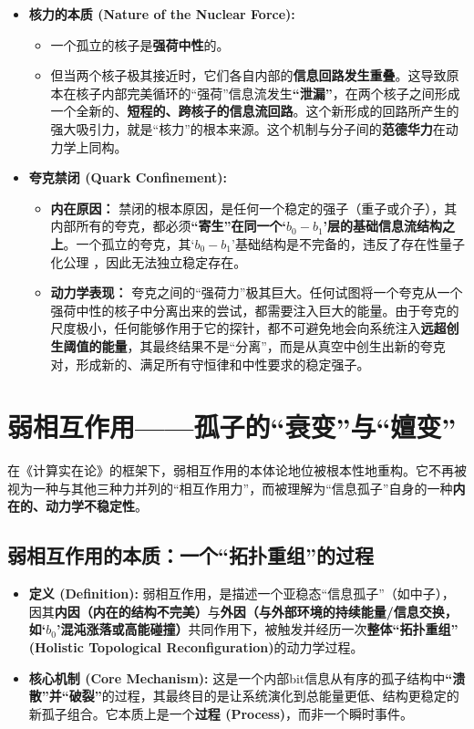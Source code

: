 \documentclass[12pt]{article}
\begin{document}
\begin{itemize}
    \item \textbf{核力的本质 (Nature of the Nuclear Force):}
    \begin{itemize}
        \item 一个孤立的核子是\textbf{强荷中性}的。
        \item 但当两个核子极其接近时，它们各自内部的\textbf{信息回路发生重叠}。这导致原本在核子内部完美循环的``强荷''信息流发生\textbf{``泄漏''}，在两个核子之间形成一个全新的、\textbf{短程的、跨核子的信息流回路}。这个新形成的回路所产生的强大吸引力，就是``核力''的根本来源。这个机制与分子间的\textbf{范德华力}在动力学上同构。
    \end{itemize}
    
    \item \textbf{夸克禁闭 (Quark Confinement):}
    \begin{itemize}
        \item \textbf{内在原因：} 禁闭的根本原因，是任何一个稳定的强子（重子或介子），其内部所有的夸克，都必须\textbf{``寄生''在同一个`$b_0-b_1$'层的基础信息流结构之上}。一个孤立的夸克，其`$b_0-b_1$'基础结构是不完备的，违反了存在性量子化公理 ，因此无法独立稳定存在。
        \item \textbf{动力学表现：} 夸克之间的``强荷力''极其巨大。任何试图将一个夸克从一个强荷中性的核子中分离出来的尝试，都需要注入巨大的能量。由于夸克的尺度极小，任何能够作用于它的探针，都不可避免地会向系统注入\textbf{远超创生阈值的能量}，其最终结果不是``分离''，而是从真空中创生出新的夸克对，形成新的、满足所有守恒律和中性要求的稳定强子。
    \end{itemize}
\end{itemize}

\section{弱相互作用——孤子的``衰变''与``嬗变''}

在《计算实在论》的框架下，弱相互作用的本体论地位被根本性地重构。它不再被视为一种与其他三种力并列的``相互作用力''，而被理解为``信息孤子''自身的一种\textbf{内在的、动力学不稳定性}。

\subsection{弱相互作用的本质：一个``拓扑重组''的过程}

\begin{itemize}
    \item \textbf{定义 (Definition):} 弱相互作用，是描述一个亚稳态``信息孤子''（如中子），因其\textbf{内因（内在的结构不完美）}与\textbf{外因（与外部环境的持续能量/信息交换，如`$b_0$'混沌涨落或高能碰撞）}共同作用下，被触发并经历一次\textbf{整体``拓扑重组'' (Holistic Topological Reconfiguration)}的动力学过程。
    \item \textbf{核心机制 (Core Mechanism):} 这是一个内部bit信息从有序的孤子结构中\textbf{``溃散''并``破裂''}的过程，其最终目的是让系统演化到总能量更低、结构更稳定的新孤子组合。它本质上是一个\textbf{过程 (Process)}，而非一个瞬时事件。
\end{itemize}
\end{document}
